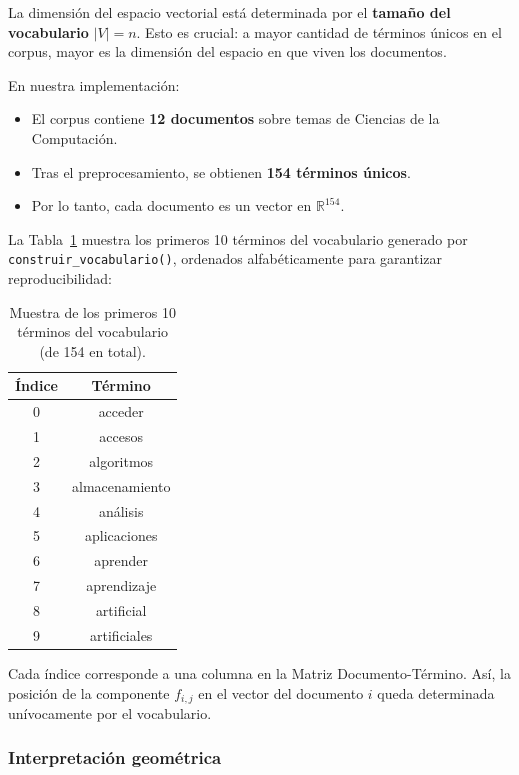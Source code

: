 La dimensión del espacio vectorial está determinada por el \textbf{tamaño del vocabulario} $|V| = n$. Esto es crucial: a mayor cantidad de términos únicos en el corpus, mayor es la dimensión del espacio en que viven los documentos.

En nuestra implementación:
\begin{itemize}
    \item El corpus contiene \textbf{12 documentos} sobre temas de Ciencias de la Computación.
    \item Tras el preprocesamiento, se obtienen \textbf{154 términos únicos}.
    \item Por lo tanto, cada documento es un vector en $\mathbb{R}^{154}$.
\end{itemize}

La Tabla~\ref{tab:vocab_muestra} muestra los primeros 10 términos del vocabulario generado por \texttt{construir\_vocabulario()}, ordenados alfabéticamente para garantizar reproducibilidad:

\begin{table}[H]
\centering
\caption{Muestra de los primeros 10 términos del vocabulario (de 154 en total).}
\label{tab:vocab_muestra}
\begin{tabular}{|c|c|}
\hline
\textbf{Índice} & \textbf{Término} \\
\hline
0  & acceder \\
1  & accesos \\
2  & algoritmos \\
3  & almacenamiento \\
4  & análisis \\
5  & aplicaciones \\
6  & aprender \\
7  & aprendizaje \\
8  & artificial \\
9  & artificiales \\
\hline
\end{tabular}
\end{table}

Cada índice corresponde a una columna en la Matriz Documento-Término. Así, la posición de la componente $f_{i,j}$ en el vector del documento $i$ queda determinada unívocamente por el vocabulario.

\subsubsection{Interpretación geométrica}

